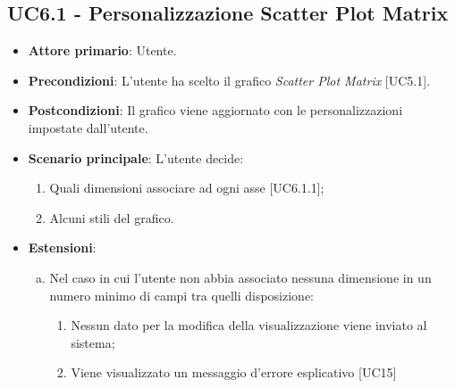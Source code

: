 \subsection{UC6.1 - Personalizzazione Scatter Plot Matrix}
\begin{itemize}
	\item \textbf{Attore primario}: Utente.
	
	\item \textbf{Precondizioni}: L'utente ha scelto il grafico \textit{Scatter Plot Matrix} [UC5.1].
	
	\item \textbf{Postcondizioni}: Il grafico viene aggiornato con le personalizzazioni impostate dall'utente.
	
	\item \textbf{Scenario principale}: L'utente decide:

\begin{enumerate}
\item Quali dimensioni associare ad ogni asse [UC6.1.1];
\item Alcuni stili del grafico.
\end{enumerate}	
	
		
	\item \textbf{Estensioni}:
	\begin{enumerate}[(a)]
		\item Nel caso in cui l'utente non abbia associato nessuna dimensione in un numero minimo di campi tra quelli disposizione:
		\begin{enumerate}[1.]
			\item Nessun dato per la modifica della visualizzazione viene inviato al sistema;
			\item Viene visualizzato un messaggio d'errore esplicativo [UC15]
		\end{enumerate}
	\end{enumerate}
\end{itemize}


